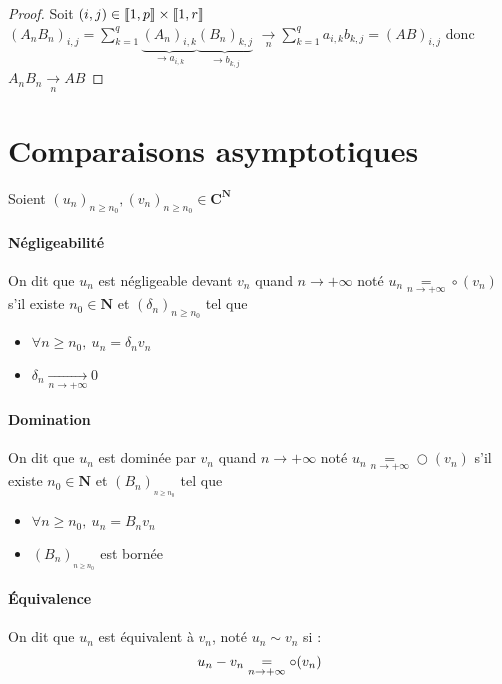 		\begin{proof}
			Soit $(i,j)\in{\llbracket 1,p \rrbracket}\times{\llbracket 1,r \rrbracket}$ \\ 
			$\left(A_nB_n\right) _{i,j} = \sum_{k=1}^{q} \underbrace{\left(A_n\right)_{i,k}}_{\rightarrow a_{i,k}}
			\underbrace{\left(B_n\right)_{k,j}}_{\rightarrow b_{k,j}}$ $\underset{n}{\rightarrow} \sum_{k=1}^{q} a_{i,k}b_{k,j} = (AB)_{i,j}$ donc 
			$A_nB_n \underset{n}{\rightarrow} AB$
		\end{proof}


\section{Comparaisons asymptotiques}
	
		Soient $\left(u_n\right)_{n\geq n_0} ,\left(v_n\right)_{n\geq n_0} \in \mathbf{C}^{\mathbf{N}}$ 
		
		\traitd
		\paragraph{Négligeabilité}
			On dit que $u_n$ est négligeable devant $v_n$ quand $n\rightarrow +\infty$ noté $u_n \underset{n\rightarrow +\infty}{=} \circ (v_n)$ s'il existe $n_0 \in \mathbf{N}$ et $\left(\delta_n\right)_{n\geq n_0}$ tel que
			\begin{itemize}
				\item $\forall n\geq n_0 ,~u_n = \delta_nv_n$
				\item $\delta_n \underset{n\rightarrow +\infty}{\longrightarrow} 0$
			\end{itemize}
		\trait
		
		\newpage 
		
		\traitd
		\paragraph{Domination}
			On dit que $u_n$ est dominée par $v_n$ quand $n\rightarrow +\infty$ noté $u_n \underset{n\rightarrow +\infty}{=} \bigcirc (v_n)$ s'il existe $n_0 \in \mathbf{N}$ et $\left(B_n\right)_{_{n\geq n_0}}$ tel que
			\begin{itemize}
				\item $\forall n\geq n_0 ,~u_n = B_nv_n$ 
				\item $\left( B_n \right)_{_{n\geq n_0}}$ est bornée
			\end{itemize}
		\traitdouble
		\paragraph{Équivalence}
			On dit que $u_n$ est équivalent à $v_n$, noté $u_n \sim v_n$ 
			si : 
			\[
				u_n - v_n \underset{n\rightarrow +\infty}{=} \circ (v_n) 
			\vspace*{-25pt}
			\]
		\trait

